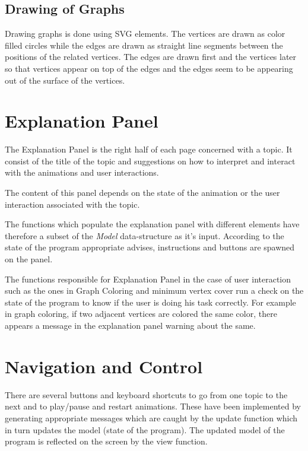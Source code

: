 \subsection{Drawing of Graphs}
Drawing graphs is done using SVG elements. The vertices are drawn as color
filled circles while the edges are drawn as straight line segments between the
positions of the related vertices. The edges are drawn first and the vertices
later so that vertices appear on top of the edges and the edges seem to be
appearing out of the surface of the vertices.

\section{Explanation Panel}

The Explanation Panel is the right half of each page concerned with a topic. 
It consist of the title of the topic and suggestions on how
to interpret and interact with the animations and user interactions.

The content of this panel depends on the state of the animation or the user
interaction associated with the topic.

The functions which populate the explanation panel with different elements have
therefore a subset of the \emph{Model} data-structure as it's input.  According
to the state of the program appropriate advises, instructions and buttons are
spawned on the panel.

The functions responsible for Explanation Panel in the case of user interaction
such as the ones in Graph Coloring and minimum vertex cover run a check on the
state of the program to know if the user is doing his task correctly. For
example in graph coloring, if two adjacent vertices are colored the same color,
there appears a message in the explanation panel warning about the same.

\section{Navigation and Control}
There are several buttons and keyboard shortcuts to go from one topic to the
next and to play/pause and restart animations. These have been implemented by
generating appropriate messages which are caught by the update function which
in turn updates the model (state of the program). The updated model of the
program is reflected on the screen by the view function.

